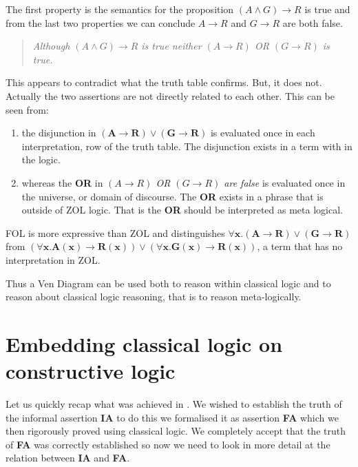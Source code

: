  The first property is the semantics for the proposition  $(A\wedge G) \rightarrow R$ is true and from the  last two properties we can conclude   $A \rightarrow R$ and $  G\rightarrow R$ are both false. 
 \begin{quotation}
 \emph{Although  $(A\wedge G) \rightarrow R$  is true  neither $(A \rightarrow R)$ OR $  (G\rightarrow R)$ is true. }
\end{quotation}   
 This appears to contradict what the truth table confirms. But, it does not. Actually the two assertions are not directly related to each other. This can be seen from:
 \begin{enumerate}
 \item the disjunction in  $ \mathbf{(A\rightarrow R)\vee (G\rightarrow R)}$ is evaluated once in each interpretation, row of the truth table. The disjunction exists in a term with in the logic.
 \item whereas the {\bf OR} in \emph{$(A \rightarrow R)$ OR $  (G\rightarrow R)$ are false} is evaluated once in the universe, or domain of discourse. The {\bf OR} exists in a phrase that is outside of ZOL logic. That is the {\bf OR} should be interpreted as meta logical.
 \end{enumerate}

FOL is more expressive than ZOL  and  distinguishes   $ \mathbf{\forall x. (A\rightarrow R)\vee (G\rightarrow R)}$ from  $ \mathbf{(\forall x. A(x)\rightarrow R(x))\vee (\forall x. G(x)\rightarrow R(x))}$, a term that has no interpretation in ZOL.


Thus a Ven Diagram  can be used both to reason within classical logic and to reason about classical logic reasoning, that is to reason meta-logically. 


  
  \section{Embedding classical logic on constructive logic}
 
Let us quickly recap what was achieved in . We wished to establish the truth of the informal assertion {\bf IA} to do this we formalised it as assertion {\bf FA} which we then rigorously proved using classical logic. We completely accept that the truth of {\bf FA} was correctly established so now we  need to look in more detail at the relation between {\bf IA} and {\bf FA}.

